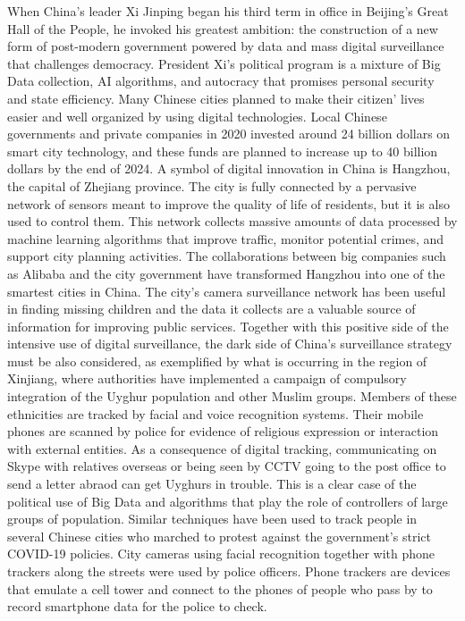 When China's leader Xi Jinping began his third term in office in Beijing's Great Hall of the People, he invoked his greatest ambition: the construction of a new form of post-modern government powered by data and mass digital surveillance that challenges democracy. President Xi's political program is a mixture of Big Data collection, AI algorithms, and autocracy that promises personal security and state efficiency. Many Chinese cities planned to make their citizen' lives easier and well organized by using digital technologies. Local Chinese governments and private companies in 2020 invested around 24 billion dollars on smart city technology, and these funds are planned to increase up to 40 billion dollars by the end of 2024. A symbol of digital innovation in China is Hangzhou, the capital of Zhejiang province. The city is fully connected by a pervasive network of sensors meant to improve the quality of life of residents, but it is also used to control them. This network collects massive amounts of data processed by machine learning algorithms that improve traffic, monitor potential crimes, and support city planning activities. The collaborations between big companies such as Alibaba and the city government have transformed Hangzhou into one of the smartest cities in China. The city's camera surveillance network has been useful in finding missing children and the data it collects are a valuable source of information for improving public services. Together with this positive side of the intensive use of digital surveillance, the dark side of China's surveillance strategy must be also considered, as exemplified by what is occurring in the region of Xinjiang, where authorities have implemented a campaign of compulsory integration of the Uyghur population and other Muslim groups. Members of these ethnicities are tracked by facial and voice recognition systems. Their mobile phones are scanned by police for evidence of religious expression or interaction with external entities. As a consequence of digital tracking, communicating on Skype with relatives overseas or being seen by CCTV going to the post office to send a letter abraod can get Uyghurs in trouble. This is a clear case of the political use of Big Data and algorithms that play the role of controllers of large groups of population. Similar techniques have been used to track people in several Chinese cities who marched to protest against the government's strict COVID-19 policies. City cameras using facial recognition together with phone trackers along the streets were used by police officers. Phone trackers are devices that emulate a cell tower and connect to the phones of people who pass by to record smartphone data for the police to check.

